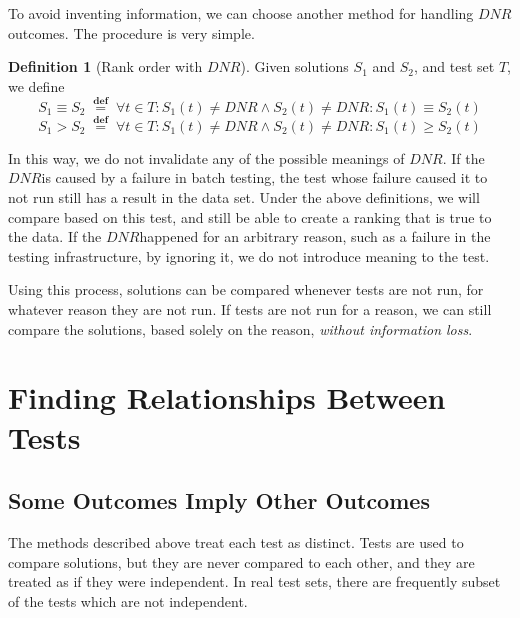 \documentclass[11pt,twoside]{article}
\newcommand\dnr{\ensuremath{\mathit{DNR}}}
\newcommand\defined{\mathrel{\;\stackrel{\scriptscriptstyle\mathbf{def}}{=}\;}}
\theoremstyle{definition}
\newtheorem{defn}{Definition}
\begin{document}
To avoid inventing information, we can choose another method for handling \dnr outcomes. The procedure is very simple.
\begin{defn}[Rank order with \dnr]
Given solutions $S_1$ and $S_2$, and test set $T$, we define
$$S_1 \equiv S_2 \defined \forall t \in T : S_1(t) \neq \dnr \wedge S_2(t) \neq \dnr : S_1(t) \equiv S_2(t)$$
$$S_1 > S_2 \defined \forall t \in T : S_1(t) \neq \dnr \wedge S_2(t) \neq \dnr : S_1(t) \geq S_2(t)$$
\end{defn}
In this way, we do not invalidate any of the possible meanings of \dnr. If the \dnr is caused by a failure in batch testing, the test whose failure caused it to not run still has a result in the data set. Under the above definitions, we will compare based on this test, and still be able to create a ranking that is true to the data. If the \dnr happened for an arbitrary reason, such as a failure in the testing infrastructure, by ignoring it, we do not introduce meaning to the test. 

Using this process, solutions can be compared whenever tests are not run, for whatever reason they are not run. If tests are not run for a reason, we can still compare the solutions, based solely on the reason, \emph{without information loss}.

\section{Finding Relationships Between Tests}
\subsection{Some Outcomes Imply Other Outcomes}
The methods described above treat each test as distinct. Tests are used to compare solutions, but they are never compared to each other, and they are treated as if they were independent. In real test sets, there are frequently subset of the tests which are not independent.
\end{document}
